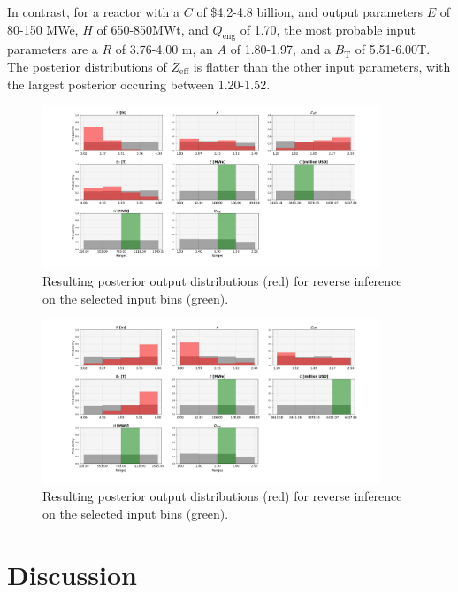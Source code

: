 \documentclass[journal]{IEEEtran}
\begin{document}
In contrast, for a reactor with a $C$ of \$4.2-4.8 billion, and output parameters $E$ of 80-150 MWe, $H$ of 650-850MWt, and $Q_{\text{eng}}$ of 1.70, the most probable input parameters are a $R$ of 3.76-4.00 m, an $A$ of 1.80-1.97, and a $B_{\text{T}}$ of 5.51-6.00T. The posterior distributions of $Z_{\text{eff}}$ is flatter than the other input parameters, with the largest posterior occuring between 1.20-1.52.

\begin{figure}[t]
    \centering
    \includegraphics[width=0.9\textwidth]{figures/TE_results/config(44)_4outputs/Figure_4_v2.png}
    \caption{Resulting posterior output distributions (red) for reverse
    inference on the selected input bins (green).}\label{fig:BN_case_study}
\end{figure}

\begin{figure}[t]
    \centering
    \includegraphics[width=0.9\textwidth]{figures/TE_results/config(44)_4outputs/Figure_5_V2.png}
    \caption{Resulting posterior output distributions (red) for reverse
    inference on the selected input bins (green).}\label{fig:BN_case_study2}
\end{figure}

\section{Discussion}\label{sec:Discussion}
\end{document}
